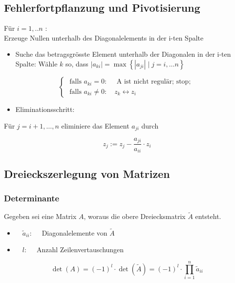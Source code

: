 \subsection{Fehlerfortpflanzung und Pivotisierung}

Für $i=1, . . n$ :\\
Erzeuge Nullen unterhalb des Diagonalelements in der i-ten Spalte

\begin{itemize}
  \item Suche das betragsgrösste Element unterhalb der Diagonalen in der i-ten Spalte: Wähle $k$ so, dass $\left|a_{k i}\right|=\max \left\{\left|a_{j i}\right| \mid j=i, \ldots n\right\}$
\end{itemize}

$$
\left\{\begin{array}{l}
\text { falls } a_{k i}=0: \quad \text { A ist nicht regulär; stop; } \\
\text { falls } a_{k i} \neq 0: \quad z_{k} \leftrightarrow z_{i}
\end{array}\right.
$$

\begin{itemize}
  \item Eliminationsschritt:
\end{itemize}

Für $j=i+1, \ldots, n$ eliminiere das Element $a_{j i}$ durch

$$
z_{j}:=z_{j}-\frac{a_{j i}}{a_{i i}} \cdot z_{i}
$$

\subsection{Dreieckszerlegung von Matrizen}

\subsubsection{Determinante}

Gegeben sei eine Matrix $A$, woraus die obere Dreiecksmatrix $\tilde{A}$ entsteht.

\begin{itemize}
  \item $\quad \tilde{a}_{i i}: \quad$ Diagonalelemente von $\tilde{A}$
  \item $\quad l: \quad$ Anzahl Zeilenvertauschungen
\end{itemize}

$$
\operatorname{det}(A)=(-1)^{l} \cdot \operatorname{det}(\tilde{A})=(-1)^{l} \cdot \prod_{i=1}^{n} \tilde{a}_{i i}
$$

